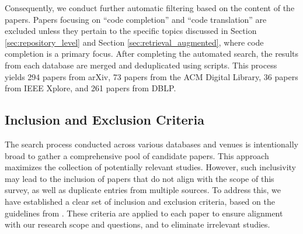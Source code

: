 Consequently, we conduct further automatic filtering based on the content of the papers. 
Papers focusing on ``code completion'' and ``code translation'' are excluded unless they pertain to the specific topics discussed in Section \ref{sec:repository_level} and Section \ref{sec:retrieval_augmented}, where code completion is a primary focus. 
After completing the automated search, the results from each database are merged and deduplicated using scripts. 
This process yields 294 papers from arXiv, 73 papers from the ACM Digital Library, 36 papers from IEEE Xplore, and 261 papers from DBLP.


\subsection{Inclusion and Exclusion Criteria}\label{sec:review_criteria}
The search process conducted across various databases and venues is intentionally broad to gather a comprehensive pool of candidate papers. 
This approach maximizes the collection of potentially relevant studies. 
However, such inclusivity may lead to the inclusion of papers that do not align with the scope of this survey, as well as duplicate entries from multiple sources. 
To address this, we have established a clear set of inclusion and exclusion criteria, based on the guidelines from \cite{hou2024large,wang2024software}. 
These criteria are applied to each paper to ensure alignment with our research scope and questions, and to eliminate irrelevant studies.



